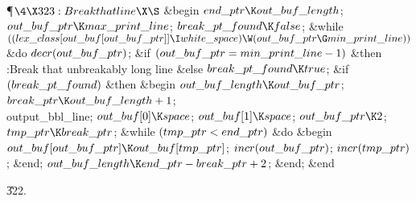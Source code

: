 \Y\P$\4\X323:Break that line\X\S$\6
\&{begin} $\\{end\_ptr}\K\\{out\_buf\_length}$;\5
$\\{out\_buf\_ptr}\K\\{max\_print\_line}$;\5
$\\{break\_pt\_found}\K\\{false}$;\6
\&{while} $((\\{lex\_class}[\\{out\_buf}[\\{out\_buf\_ptr}]]\I\\{white\_space})%
\W(\\{out\_buf\_ptr}\G\\{min\_print\_line}))$ \1\&{do}\5
$\\{decr}(\\{out\_buf\_ptr})$;\2\6
\&{if} $(\\{out\_buf\_ptr}=\\{min\_print\_line}-1)$ \1\&{then}\6
:Break that unbreakably long line\X{}\6
\4\&{else} $\\{break\_pt\_found}\K\\{true}$;\2\6
\&{if} $(\\{break\_pt\_found})$ \1\&{then}\6
\&{begin} $\\{out\_buf\_length}\K\\{out\_buf\_ptr}$;\5
$\\{break\_ptr}\K\\{out\_buf\_length}+1$;\5
\\{output\_bbl\_line};\6
$\\{out\_buf}[0]\K\\{space}$;\5
$\\{out\_buf}[1]\K\\{space}$;\6
$\\{out\_buf\_ptr}\K2$;\5
$\\{tmp\_ptr}\K\\{break\_ptr}$;\6
\&{while} $(\\{tmp\_ptr}<\\{end\_ptr})$ \1\&{do}\6
\&{begin} $\\{out\_buf}[\\{out\_buf\_ptr}]\K\\{out\_buf}[\\{tmp\_ptr}]$;\5
$\\{incr}(\\{out\_buf\_ptr})$;\5
$\\{incr}(\\{tmp\_ptr})$;\6
\&{end};\2\6
$\\{out\_buf\_length}\K\\{end\_ptr}-\\{break\_ptr}+2$;\6
\&{end};\2\6
\&{end}\par
\U322.\fi


